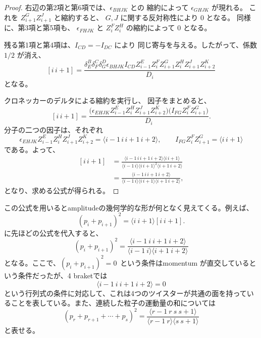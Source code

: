 \documentclass[uplatex,dvipdfmx,a4paper,11pt]{jsarticle}
\renewcommand{\proofname}{Proof}
\newenvironment{myproof}[1][\proofname]
  {\begin{proof}[#1]}
  {\end{proof}}
\numberwithin{equation}{section}
\begin{document}
\begin{myproof}
  右辺の第2項と第6項では、$\epsilon_{BHJK}$ との
  縮約によって $\epsilon_{GHJK}$ が現れる。
  これを $Z_{i+1}^G Z_{i+1}^J$ と縮約すると、
  $G,J$ に関する反対称性により $0$ となる。
  同様に、第3項と第5項も、
  $\epsilon_{FHJK}$ と $Z_i^F Z_i^H$ の縮約によって
  $0$ となる。

  残る第1項と第4項は、$I_{CD}=-I_{DC}$ により
  同じ寄与を与える。したがって、係数 $1/2$ が消え、
  \[
    [i\,i+1]
      =
      \frac{
        \delta_E^B\delta_F^C\delta_G^D
        \epsilon_{BHJK}I_{CD}
        Z_{i-1}^E Z_i^F Z_{i+1}^G
        Z_i^H Z_{i+1}^J Z_{i+2}^K
      }{D_i}
  \]
  となる。

  クロネッカーのデルタによる縮約を実行し、
  因子をまとめると、
  \[
    [i\,i+1]
      =
      \frac{
        \bigl(
          \epsilon_{EHJK}
          Z_{i-1}^E Z_i^H Z_{i+1}^J Z_{i+2}^K
        \bigr)
        \bigl(
          I_{FG}Z_i^F Z_{i+1}^G
        \bigr)
      }{D_i}.
  \]
  分子の二つの因子は、それぞれ
  \[
    \epsilon_{EHJK}
      Z_{i-1}^E Z_i^H Z_{i+1}^J Z_{i+2}^K
      =\langle i-1\,i\,i+1\,i+2\rangle,
    \qquad
    I_{FG}Z_i^F Z_{i+1}^G
      =\langle i\,i+1\rangle
  \]
  である。よって、
  \[
    \begin{aligned}
      [i\,i+1]
      &=
      \frac{
        \langle i-1\,i\,i+1\,i+2\rangle
        \langle i\,i+1\rangle
      }{
        \langle i-1\,i\rangle
        \langle i\,i+1\rangle^2
        \langle i+1\,i+2\rangle
      }\\
      &=
      \frac{
        \langle i-1\,i\,i+1\,i+2\rangle
      }{
        \langle i-1\,i\rangle
        \langle i\,i+1\rangle
        \langle i+1\,i+2\rangle
      },
    \end{aligned}
  \]
  となり、求める公式が得られる。
\end{myproof}
この公式を用いるとamplitudeの幾何学的な形が何となく見えてくる。例えば、
\[
(p_i+p_{i+1})^2
=
\langle i\ i+1\rangle[i\ i+1].
\]
に先ほどの公式を代入すると、
\[
(p_i+p_{i+1})^2
=
\frac{
\langle i-1\ i\ i+1\ i+2\rangle
}{
\langle i-1\ i\rangle
\langle i+1\ i+2\rangle
}
\]
となる。ここで、$(p_i+p_{i+1})^2 = 0$~という条件はmomentum が直交しているという条件だったが、4 braketでは
\[
\langle i-1\ i\ i+1\ i+2\rangle=0
\]
という行列式の条件に対応して、これは4つのツイスターが共通の面を持っていることを表している。また、連続した粒子の運動量の和については
\[
(p_r+p_{r+1}+\cdots+p_s)^2
=
\frac{
\langle r-1\ r\ s\ s+1\rangle
}{
\langle r-1\ r\rangle
\langle s\ s+1\rangle
}
\]
と表せる。
\end{document}
